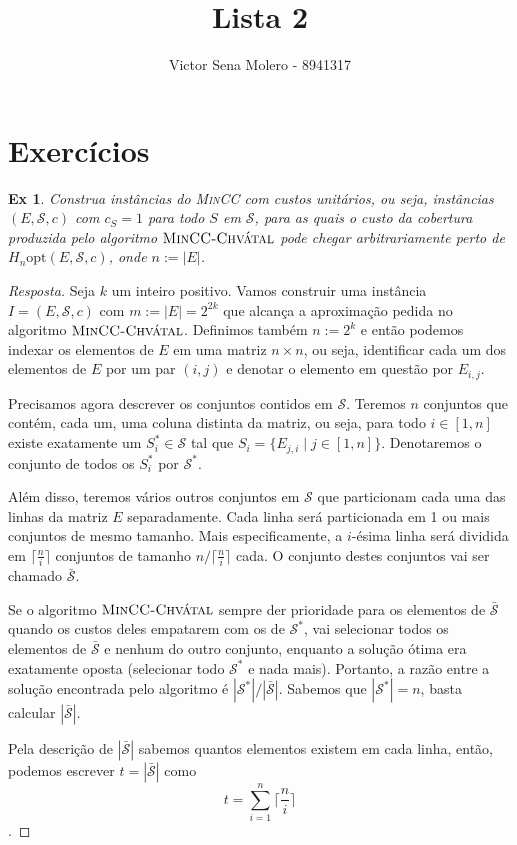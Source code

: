 \documentclass[12pt]{article}
\newcounter{exCounter}
\newtheorem{ex}[exCounter]{Ex}
\begin{document}
 
 
\title{Lista 2}
\author{Victor Sena Molero - 8941317}
\maketitle

\section{Exercícios}
\begin{ex}
Construa instâncias do \textsc{MinCC} com custos unitários, ou seja, instâncias $(E,\mathcal{S},c)$ com $c_S = 1$ para todo $S$ em $\mathcal{S}$, para as quais o custo da cobertura produzida pelo algoritmo $\textsc{MinCC-Chvátal}$ pode chegar arbitrariamente perto de $H_n\mathrm{opt}(E,\mathcal{S},c)$, onde $n := |E|$.
\end{ex}

\begin{proof}[Resposta]
Seja $k$ um inteiro positivo. Vamos construir uma instância $I = (E,\mathcal{S},c)$ com $m := |E| = 2^{2k}$ que alcança a aproximação pedida no algoritmo $\textsc{MinCC-Chvátal}$. Definimos também $n := 2^k$ e então podemos indexar os elementos de $E$ em uma matriz $n \times n$, ou seja, identificar cada um dos elementos de $E$ por um par $(i,j)$ e denotar o elemento em questão por $E_{i,j}$.  

Precisamos agora descrever os conjuntos contidos em $\mathcal{S}$. Teremos $n$ conjuntos que contém, cada um, uma coluna distinta da matriz, ou seja, para todo $i \in [1, n]$ existe exatamente um $S^*_i \in \mathcal{S}$ tal que $S_i = \{E_{j,i} \mid j \in [1, n]\}$. Denotaremos o conjunto de todos os $S^*_i$ por $\mathcal{S}^*$.

Além disso, teremos vários outros conjuntos em $\mathcal{S}$ que particionam cada uma das linhas da matriz $E$ separadamente. Cada linha será particionada em 1 ou mais conjuntos de mesmo tamanho. Mais especificamente, a $i$-ésima linha será dividida em $\lceil \frac{n}{i} \rceil$ conjuntos de tamanho $n/\lceil \frac{n}{i} \rceil$ cada. O conjunto destes conjuntos vai ser chamado $\bar{\mathcal{S}}$.

Se o algoritmo $\textsc{MinCC-Chvátal}$ sempre der prioridade para os elementos de $\bar{\mathcal{S}}$ quando os custos deles empatarem com os de $\mathcal{S}^*$, vai selecionar todos os elementos de $\bar{\mathcal{S}}$ e nenhum do outro conjunto, enquanto a solução ótima era exatamente oposta (selecionar todo $\mathcal{S}^*$ e nada mais). Portanto, a razão entre a solução encontrada pelo algoritmo é $|\mathcal{S}^*|/|\bar{\mathcal{S}}|$. Sabemos que $|\mathcal{S}^*| = n$, basta calcular $|\bar{\mathcal{S}}|$.

Pela descrição de $|\bar{\mathcal{S}}|$ sabemos quantos elementos existem em cada linha, então, podemos escrever $t = |\bar{\mathcal{S}}|$ como
$$ t = \sum \limits_{i=1}^{n} \lceil \frac{n}{i} \rceil $$.
\end{proof}
\end{document}
